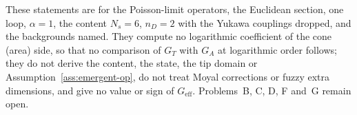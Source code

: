 These statements are for the Poisson-limit operators, the Euclidean section, one loop, \(\alpha=1\), the content \(N_s=6\), \(n_D=2\) with the Yukawa couplings dropped, and the backgrounds named. They compute no logarithmic coefficient of the cone (area) side, so that no comparison of \(G_T\) with \(G_A\) at logarithmic order follows; they do not derive the content, the state, the tip domain or Assumption~\ref{ass:emergent-op}, do not treat Moyal corrections or fuzzy extra dimensions, and give no value or sign of \(G_{\mathrm{eff}}\). Problems~B, C, D, F and~G remain open.
